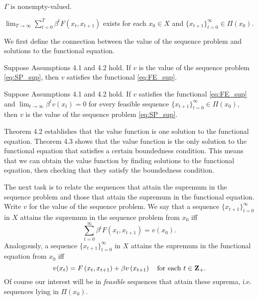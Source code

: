 \documentclass[11pt,letterpaper,reqno,oneside]{article}
\begin{document}
\begin{assumption}
	$\Gamma$ is nonempty-valued.
\end{assumption}

\begin{assumption}
	$\lim_{T\to\infty} \sum_{t=0}^T \beta^t F(x_t,x_{t+1})$ exists for each $x_0 \in X$ and $\{ x_{t+1} \}_{t=0}^\infty \in \Pi(x_0)$.
\end{assumption}


We first define the connection between the value of the sequence problem and solutions to the functional equation.
%
\begin{theorem}[SLP Th'm 4.2]
	Suppose Assumptions 4.1 and 4.2 hold. If $v$ is the value of the sequence problem \eqref{eq:SP_sup}, then $v$ satisfies the functional \cref{eq:FE_sup}.
\end{theorem}
%
\begin{theorem}[SLP Th'm 4.3]
	Suppose Assumptions 4.1 and 4.2 hold. If $v$ satisfies the functional \cref{eq:FE_sup} and $\lim_{t\to\infty} \beta^t v(x_t) = 0$ for every feasible sequence $\{x_{t+1}\}_{t=0}^\infty \in \Pi(x_0)$, then $v$ is the value of the sequence problem \eqref{eq:SP_sup}.
\end{theorem}

Theorem 4.2 establishes that the value function is one solution to the functional equation. Theorem 4.3 shows that the value function is the only solution to the functional equation that satisfies a certain boundedness condition. This means that we can obtain the value function by finding solutions to the functional equation, then checking that they satisfy the boundedness condition.

The next task is to relate the sequences that attain the supremum in the sequence problem and those that attain the supremum in the functional equation. Write $v$ for the value of the sequence problem. We say that a sequence $\{x_{t+1}\}_{t=0}^\infty$ in $X$ attains the supremum in the sequence problem from $x_0$ iff 
%
\begin{equation*}
	\sum_{t=0}^\infty \beta^t F(x_t,x_{t+1}) = v(x_0) .
\end{equation*}
%
Analogously, a sequence $\{x_{t+1}\}_{t=0}^\infty$ in $X$ attains the supremum in the functional equation from $x_0$ iff
%
\begin{equation*}
	v(x_t)
	= F \left( x_t, x_{t+1} \right) + \beta v \left( x_{t+1} \right)
	\quad\text{for each $t \in \mathbf{Z}_+$} .
\end{equation*}
%
Of course our interest will be in \emph{feasible} sequences that attain these suprema, i.e. sequences lying in $\Pi(x_0)$.
\end{document}
